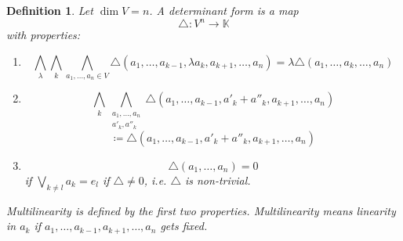 \documentclass[a4paper,landscape,twocolumn]{article}
\newtheorem{defi}{Definition}
\begin{document}
\begin{defi}
  Let $\dim{V} = n$. A \emph{determinant form} is a map
  \[ \triangle: V^n \to \mathbb K \]
  with properties:
  \begin{enumerate}
    \item
      \[
        \bigwedge_{\lambda} \bigwedge_{k} \bigwedge_{a_1,\ldots,a_n \in V}
        \triangle (a_1, \ldots, a_{k-1}, \lambda a_k, a_{k+1}, \ldots, a_n)
        = \lambda \triangle (a_1, \ldots, a_k, \ldots, a_n)
      \]
    \item
      \[
        \bigwedge_k \bigwedge_{\substack{a_1, \ldots, a_n \\ a'_k, a''_k}}
        \triangle(a_1, \ldots, a_{k-1}, a'_k + a''_k, a_{k+1}, \ldots, a_n)
      \] \[
        \coloneqq \triangle(a_1, \ldots, a_{k-1}, a'_k + a''_k, a_{k+1}, \ldots, a_n)
      \]
    \item
      \[ \triangle(a_1, \ldots, a_n) = 0 \]
      if $\bigvee_{k \neq l} a_k = e_l$
      if $\triangle \neq 0$, i.e. $\triangle$ is non-trivial.
  \end{enumerate}
  Multilinearity is defined by the first two properties.
  Multilinearity means linearity in $a_k$ if $a_1, \ldots, a_{k-1}, a_{k+1}, \ldots, a_n$
  gets fixed.
\end{defi}
\end{document}
